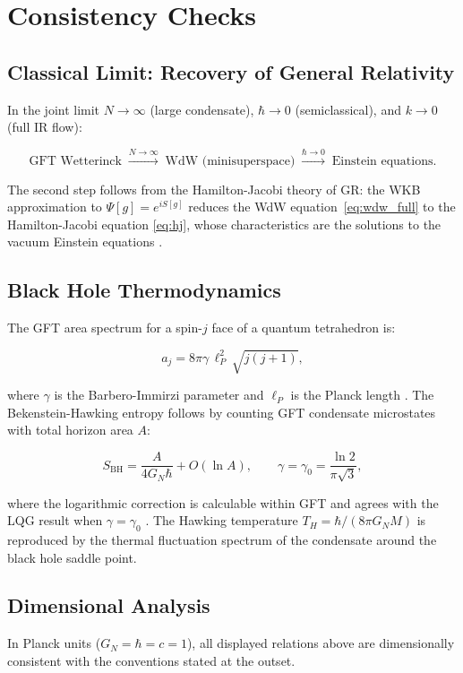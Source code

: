 \documentclass[12pt,a4paper]{article}
\newcommand{\BH}{\mathrm{BH}}
\newcommand{\lP}{\ell_P}
\begin{document}
\section{Consistency Checks}
\label{sec:consistency}

\subsection{Classical Limit: Recovery of General Relativity}

In the joint limit $N\to\infty$ (large condensate), $\hbar\to 0$
(semiclassical), and $k\to 0$ (full IR flow):

\begin{equation}
\label{eq:gr_limit}
\text{GFT Wetterinck}
\;\xrightarrow{N\to\infty}\;
\text{WdW (minisuperspace)}
\;\xrightarrow{\hbar\to 0}\;
\text{Einstein equations}.
\end{equation}

The second step follows from the Hamilton-Jacobi theory of GR:
the WKB approximation to $\Psi[g] = e^{iS[g]}$ reduces the WdW
equation~\eqref{eq:wdw_full} to the Hamilton-Jacobi equation
\eqref{eq:hj}, whose characteristics are the solutions to the
vacuum Einstein equations \cite{ashtekar2004}.

\subsection{Black Hole Thermodynamics}

The GFT area spectrum for a spin-$j$ face of a quantum tetrahedron is:

\begin{equation}
\label{eq:area_spectrum}
a_j = 8\pi\gamma\,\lP^2\,\sqrt{j(j+1)},
\end{equation}

where $\gamma$ is the Barbero-Immirzi parameter and $\lP$ is the Planck
length \cite{thiemann1996,ashtekar2004}.
The Bekenstein-Hawking entropy follows by counting GFT condensate
microstates with total horizon area $A$:

\begin{equation}
\label{eq:bh_entropy}
S_\BH = \frac{A}{4G_N\hbar} + O(\ln A),
\qquad
\gamma = \gamma_0 = \frac{\ln 2}{\pi\sqrt{3}},
\end{equation}

where the logarithmic correction is calculable within GFT and agrees
with the LQG result when $\gamma = \gamma_0$ \cite{thiemann1996}.
The Hawking temperature $T_H = \hbar/(8\pi G_N M)$ is reproduced by the
thermal fluctuation spectrum of the condensate around the black hole
saddle point.

\subsection{Dimensional Analysis}

In Planck units ($G_N = \hbar = c = 1$), all displayed relations above are dimensionally consistent with the conventions stated at the outset.
\end{document}

